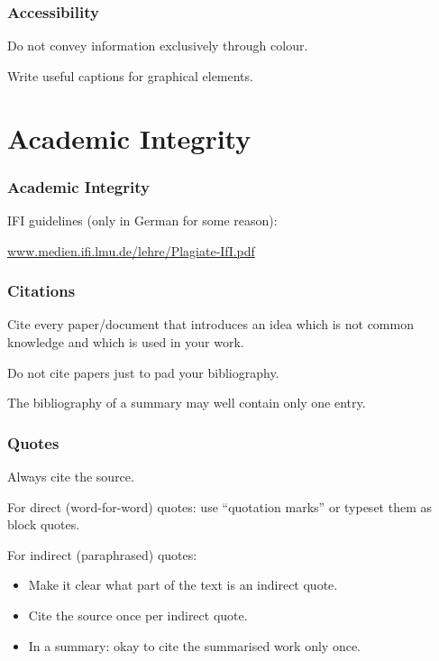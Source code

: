 \begin{frame}
  \frametitle{Accessibility}

  Do not convey information exclusively through colour.

  \medskip
  \pause

  Write useful captions for graphical elements.
\end{frame}

\section{Academic Integrity}

\begin{frame}
  \frametitle{Academic Integrity}

  IFI guidelines (only in German for some reason):

  \medskip

  \url{www.medien.ifi.lmu.de/lehre/Plagiate-IfI.pdf}
\end{frame}

\begin{frame}
  \frametitle{Citations}

  Cite every paper/document that introduces an idea which is not common knowledge and which is used in your work.

  \medskip
  \pause

  Do not cite papers just to pad your bibliography.

  The bibliography of a summary may well contain only one entry.
\end{frame}

\begin{frame}
  \frametitle{Quotes}

  Always cite the source.

  \medskip
  \pause

  For direct (word-for-word) quotes: use \enquote{quotation marks} or typeset them as block quotes.

  \medskip
  \pause

  For indirect (paraphrased) quotes:
  \begin{itemize}
    \item Make it clear what part of the text is an indirect quote.
    \item Cite the source once per indirect quote.
    \item In a summary: okay to cite the summarised work only once.
  \end{itemize}
\end{frame}

